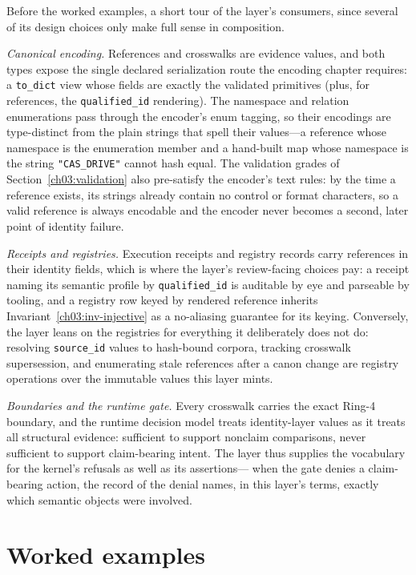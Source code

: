 Before the worked examples, a short tour of the layer's consumers,
since several of its design choices only make full sense in
composition.

\emph{Canonical encoding.} References and crosswalks are evidence
values, and both types expose the single declared serialization
route the encoding chapter requires: a \texttt{to\_dict} view whose
fields are exactly the validated primitives (plus, for references,
the \texttt{qualified\_id} rendering). The namespace and relation
enumerations pass through the encoder's enum tagging, so their
encodings are type-distinct from the plain strings that spell
their values---a reference whose namespace is the enumeration
member and a hand-built map whose namespace is the string
\texttt{"CAS\_DRIVE"} cannot hash equal. The validation grades of
Section~\ref{ch03:validation} also pre-satisfy the encoder's text
rules: by the time a reference exists, its strings already contain
no control or format characters, so a valid reference is always
encodable and the encoder never becomes a second, later point of
identity failure.

\emph{Receipts and registries.} Execution receipts and registry
records carry references in their identity fields, which is where
the layer's review-facing choices pay: a receipt naming its
semantic profile by \texttt{qualified\_id} is auditable by eye and
parseable by tooling, and a registry row keyed by rendered
reference inherits Invariant~\ref{ch03:inv-injective} as a
no-aliasing guarantee for its keying. Conversely, the layer leans
on the registries for everything it deliberately does not do:
resolving \texttt{source\_id} values to hash-bound corpora,
tracking crosswalk supersession, and enumerating stale references
after a canon change are registry operations over the immutable
values this layer mints.

\emph{Boundaries and the runtime gate.} Every crosswalk carries
the exact Ring-4 boundary, and the runtime decision model treats
identity-layer values as it treats all structural evidence:
sufficient to support nonclaim comparisons, never sufficient to
support claim-bearing intent. The layer thus supplies the
vocabulary for the kernel's refusals as well as its assertions---
when the gate denies a claim-bearing action, the record of the
denial names, in this layer's terms, exactly which semantic
objects were involved.

\section{Worked examples}\label{ch03:worked}

